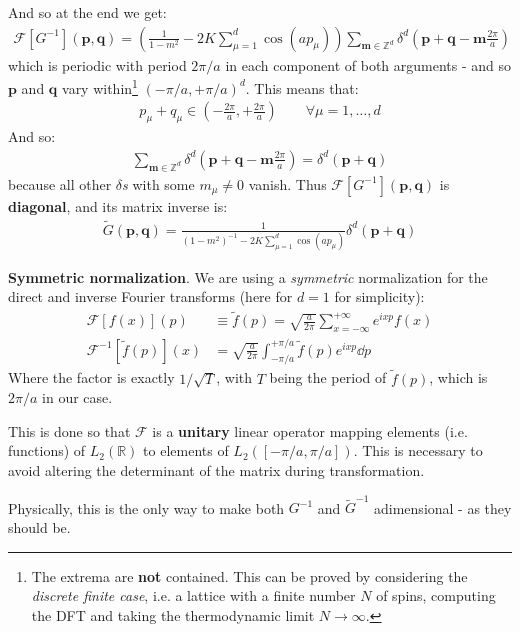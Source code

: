 \documentclass[../../main.tex]{subfiles}
\begin{document}
And so at the end we get:
\begin{align*}
    \mathcal{F}[G^{-1}](\bm{p}, \bm{q}) = \left(\frac{1}{1-m^2} - 2K\sum_{\mu=1}^d \cos(a p_\mu) \right) \sum_{\bm{m} \in \mathbb{Z}^d} \delta^d\left(\bm{p}+\bm{q}-\bm{m} \frac{2\pi}{a} \right)
\end{align*}
which is periodic with period $2\pi/a$ in each component of both arguments - and so $\bm{p}$ and $\bm{q}$ vary within\footnote{The extrema are \textbf{not} contained. This can be proved by considering the \textit{discrete finite case}, i.e. a lattice with a finite number $N$ of spins, computing the DFT and taking the thermodynamic limit $N \to \infty$.} %
$(-\pi/a, +\pi/a)^d$. This means that:
\begin{align*}
    p_\mu + q_\mu \in \left(-\frac{2\pi}{a}, +\frac{2\pi}{a}  \right) \qquad \forall \mu = 1,\dots,d 
\end{align*}
And so:
\begin{align*}
    \sum_{\bm{m} \in \mathbb{Z}^d} \delta^d(\bm{p} + \bm{q} -\bm{m} \frac{2\pi}{a}) = \delta^d(\bm{p} + \bm{q})
\end{align*}
because all other $\delta$\textit{s} with some $m_\mu \neq 0$ vanish. Thus $\mathcal{F}[G^{-1}](\bm{p}, \bm{q})$ is \textbf{diagonal}, and its matrix inverse is:
\begin{align*}
    \tilde{G}(\bm{p}, \bm{q}) = \frac{1}{\displaystyle (1-m^2)^{-1} - 2K \sum_{\mu=1}^d \cos(a p_\mu)}  \delta^d(\bm{p} + \bm{q})
\end{align*}

\begin{expl}\textbf{Symmetric normalization}. We are using a \textit{symmetric} normalization for the direct and inverse Fourier transforms (here for $d=1$ for simplicity):
    \begin{align*}
        \mathcal{F}[f(x)](p) &\equiv \tilde{f}(p) = \sqrt{\frac{a}{2\pi}}\sum_{x = -\infty}^{+\infty} e^{i x p} f(x)\\
        \mathcal{F}^{-1}[\tilde{f}(p)](x) &= \sqrt{\frac{a}{2\pi}} \int_{-\pi/a}^{+\pi/a} \tilde{f}(p) e^{i xp} \dd{p}
    \end{align*}  
Where the factor is exactly $1/\sqrt{T}$, with $T$ being the period of $\tilde{f}(p)$, which is $2\pi/a$ in our case.

This is done so that $\mathcal{F}$ is a \textbf{unitary} linear operator mapping elements (i.e. functions) of $L_2(\mathbb{R})$ to elements of $L_2([-\pi/a, \pi/a])$. This is necessary to avoid altering the determinant of the matrix during transformation. 

Physically, this is the only way to make both $G^{-1}$ and $\tilde{G}^{-1}$ adimensional - as they should be.
\end{expl}
\end{document}
